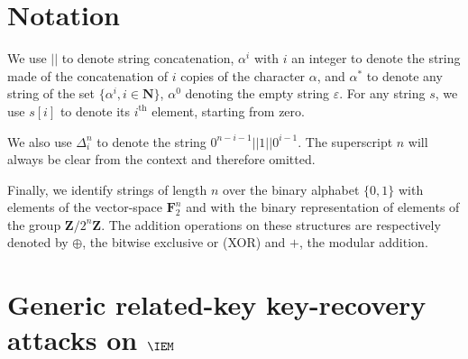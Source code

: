 
\section{Notation}

We use $||$ to denote string concatenation, $\alpha^i$ with $i$ an integer
to denote the string
made of the concatenation of $i$ copies of the character $\alpha$, and $\alpha^*$
to denote any string of the set $\{\alpha^i, i \in \mathbf{N}\}$, $\alpha^0$
denoting the empty string $\varepsilon$. For any string $s$, we use
$s[i]$ to denote its $i^\text{th}$ element, starting from zero.

We also use $\Delta_i^n$ to denote the string
$0^{n-i-1} || 1 || 0^{i - 1}$. The superscript $n$ will always
be clear from the context and therefore omitted.

Finally, we identify strings of length $n$ over the binary alphabet $\{0,1\}$ with elements of
the vector-space $\mathbf{F}_2^n$ and with the binary representation of elements of
the group $\mathbf{Z}/2^n\mathbf{Z}$. The addition operations on these structures
are respectively denoted by $\oplus$, the bitwise exclusive or (XOR) and $+$, the modular addition.

\section{Generic related-key key-recovery attacks on $\IEM$}
\label{sec:gen}


